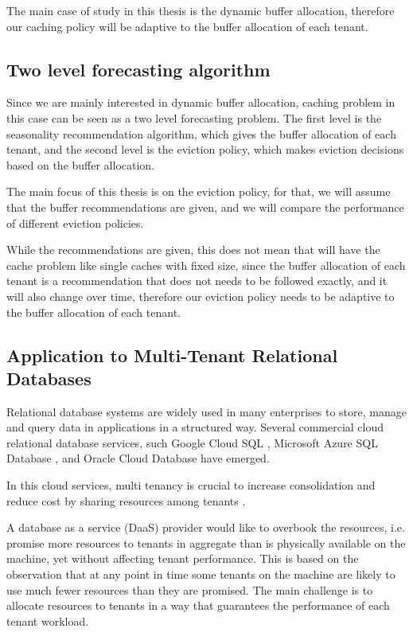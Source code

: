 The main case of study in this thesis is the dynamic buffer allocation, therefore our
caching policy will be adaptive to the buffer allocation of each tenant.

\subsection{Two level forecasting algorithm}

Since we are mainly interested in dynamic buffer allocation, caching problem in this
case can be seen as a two level forecasting problem. The first level is the seasonality
recommendation algorithm, which gives the buffer allocation of each tenant, and the
second level is the eviction policy, which makes eviction decisions based on the buffer
allocation.

The main focus of this thesis is on the eviction policy, for that, we will assume that
the buffer recommendations are given, and we will compare the performance of different
eviction policies.

While the recommendations are given, this does not mean that will have the cache problem
like single caches with fixed size, since the buffer allocation of each tenant is a 
recommendation that does not needs to be followed exactly, and it will also change
over time, therefore our eviction policy needs to be adaptive to the buffer allocation
of each tenant.

\subsection{Application to Multi-Tenant Relational Databases}

Relational database systems are widely used in many enterprises to store, manage and 
query data in applications in a structured way. Several commercial cloud relational
database services, such Google Cloud SQL \cite{google-cloud-sql}, Microsoft Azure SQL 
Database \cite{azure-sql}, and Oracle Cloud Database \cite{oracle-cloud} have emerged. 

In this cloud services, multi tenancy is crucial to increase consolidation and reduce
cost by sharing resources among tenants \cite{buffer-sharing-1}.

A database as a service (DaaS) provider would like to overbook the resources, i.e. 
promise more resources to tenants in aggregate than is physically available on the
machine, yet without affecting tenant performance. This is based on the observation 
that at any point in time some tenants on the machine are likely to use much fewer 
resources than they are promised. \cite{buffer-sharing-1} The main challenge is to 
allocate resources to tenants in a way that guarantees the performance of each tenant 
workload.

